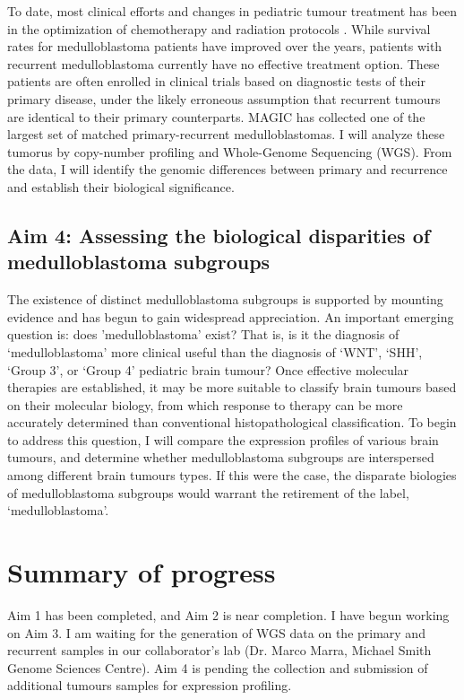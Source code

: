 \documentclass[11pt,letterpaper]{article}
\theoremstyle{definition}
\begin{document}
To date, most clinical efforts and changes in pediatric tumour treatment has been in the optimization of chemotherapy and radiation protocols . While survival rates for medulloblastoma patients have improved over the years, patients with recurrent medulloblastoma currently have no effective treatment option. These patients are often enrolled in clinical trials based on diagnostic tests of their primary disease, under the likely erroneous assumption that recurrent tumours are identical to their primary counterparts. MAGIC has collected one of the largest set of matched primary-recurrent medulloblastomas. I will analyze these tumorus by copy-number profiling and Whole-Genome Sequencing (WGS). From the data, I will identify the genomic differences between primary and recurrence and establish their biological significance.

\subsection{Aim 4: Assessing the biological disparities of medulloblastoma subgroups}

The existence of distinct medulloblastoma subgroups is supported by mounting evidence and has begun to gain widespread appreciation. An important emerging question is: does 'medulloblastoma' exist? That is, is it the diagnosis of `medulloblastoma' more clinical useful than the diagnosis of `WNT', `SHH', `Group 3', or `Group 4' pediatric brain tumour? Once effective molecular therapies are established, it may be more suitable to classify brain tumours based on their molecular biology, from which response to therapy can be more accurately determined than conventional histopathological classification. To begin to address this question, I will compare the expression profiles of various brain tumours, and determine whether medulloblastoma subgroups are interspersed among different brain tumours types. If this were the case, the disparate biologies of medulloblastoma subgroups would warrant the retirement of the label, `medulloblastoma'.

\section{Summary of progress}

Aim 1 has been completed, and Aim 2 is near completion.
I have begun working on Aim 3. I am waiting for the generation of WGS data on the primary and recurrent samples in our collaborator's lab (Dr. Marco Marra, Michael Smith Genome Sciences Centre).
Aim 4 is pending the collection and submission of additional tumours samples for expression profiling.
\end{document}
